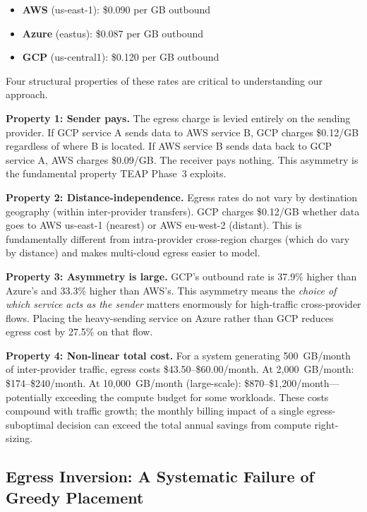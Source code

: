 \documentclass[10pt,journal]{IEEEtran}
\begin{document}
\begin{itemize}[leftmargin=*,noitemsep]
  \item \textbf{AWS} (us-east-1): \$0.090 per GB outbound
  \item \textbf{Azure} (eastus): \$0.087 per GB outbound
  \item \textbf{GCP} (us-central1): \$0.120 per GB outbound
\end{itemize}

Four structural properties of these rates are critical to understanding our approach.

\textbf{Property 1: Sender pays.}
The egress charge is levied entirely on the sending provider.
If GCP service A sends data to AWS service B, GCP charges \$0.12/GB regardless
of where B is located.
If AWS service B sends data back to GCP service A, AWS charges \$0.09/GB.
The receiver pays nothing.
This asymmetry is the fundamental property TEAP Phase~3 exploits.

\textbf{Property 2: Distance-independence.}
Egress rates do not vary by destination geography (within inter-provider transfers).
GCP charges \$0.12/GB whether data goes to AWS us-east-1 (nearest) or
AWS eu-west-2 (distant).
This is fundamentally different from intra-provider cross-region charges
(which do vary by distance) and makes multi-cloud egress easier to model.

\textbf{Property 3: Asymmetry is large.}
GCP's outbound rate is 37.9\% higher than Azure's and 33.3\% higher than AWS's.
This asymmetry means the \emph{choice of which service acts as the sender}
matters enormously for high-traffic cross-provider flows.
Placing the heavy-sending service on Azure rather than GCP reduces egress cost
by 27.5\% on that flow.

\textbf{Property 4: Non-linear total cost.}
For a system generating 500~GB/month of inter-provider traffic, egress costs
\$43.50--\$60.00/month.
At 2{,}000~GB/month: \$174--\$240/month.
At 10{,}000~GB/month (large-scale): \$870--\$1{,}200/month---potentially
exceeding the compute budget for some workloads.
These costs compound with traffic growth; the monthly billing impact of a single
egress-suboptimal decision can exceed the total annual savings from
compute right-sizing.

\subsection{Egress Inversion: A Systematic Failure of Greedy Placement}
\end{document}
